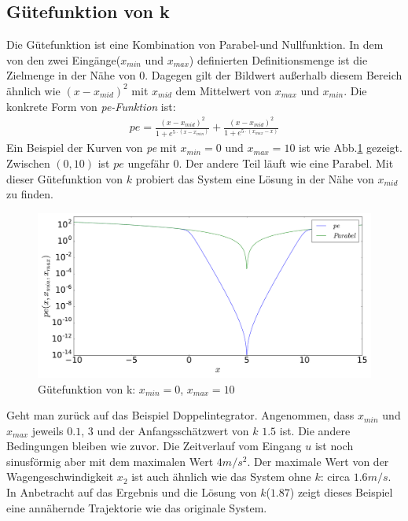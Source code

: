 \subsection{Gütefunktion von k}
\label{Gütefunktion_von_k}
Die Gütefunktion ist eine Kombination von Parabel-und Nullfunktion. In dem von den zwei Eingänge($x_{min}$ und $x_{max}$) definierten Definitionsmenge ist die Zielmenge in der Nähe von 0. Dagegen gilt der Bildwert außerhalb diesem Bereich ähnlich wie $(x-x_{mid})^{2}$ mit $x_{mid}$ dem Mittelwert von $x_{max}$ und $x_{min}$. Die konkrete Form von \emph{pe-Funktion} ist:
\begin{eqnarray}
	pe = \frac{(x-x_{mid})^{2}}{1 + e^{5\cdot (x-x_{min})}} + \frac{(x-x_{mid})^{2}}{1 + e^{5\cdot (x_{max}-x)}}\label{eq:Gütefunktion}     
\end{eqnarray}
Ein Beispiel der Kurven von \emph{pe} mit $x_{min}=0$ und $x_{max}=10$ ist wie Abb.\ref{fig:Gütefunktion_von_k} gezeigt. Zwischen $(0,10)$ ist $pe$ ungefähr 0. Der andere Teil läuft wie eine Parabel. Mit dieser Gütefunktion von $k$ probiert das System eine Lösung in der Nähe von $x_{mid}$ zu finden.
\begin{figure}
	\centering
	\includegraphics[width=12cm]{bild/pe/pe.pdf}
	\caption{Gütefunktion von k: $x_{min}=0$, $x_{max}=10$}
	\label{fig:Gütefunktion_von_k}
\end{figure}
\begin{beispiel}
	Geht man zurück auf das Beispiel Doppelintegrator. Angenommen, dass $x_{min}$ und $x_{max}$ jeweils $0.1$, $3$ und der Anfangsschätzwert von $k$ $1.5$ ist. Die andere Bedingungen bleiben wie zuvor.
	Die Zeitverlauf vom Eingang $u$ ist noch sinusförmig aber mit dem maximalen Wert $4m/s^{2}$. Der maximale Wert von der Wagengeschwindigkeit $x_{2}$ ist auch ähnlich wie das System ohne $k$: circa $1.6m/s$. In Anbetracht auf das Ergebnis und die Lösung von $k$($1.87$) zeigt dieses Beispiel eine annähernde Trajektorie wie das originale System. 
\end{beispiel}
